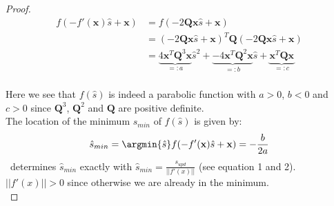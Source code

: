 \begin{proof}
\begin{equation}
\begin{aligned}
f(-f'(\mathbf{x})\hat{s}+\mathbf{x})&=
f(-2\mathbf{Q}\mathbf{x}\hat{s}+\mathbf{x})\\&=(-2\mathbf{Q}\mathbf{x}\hat{s}+\mathbf{x})^T\mathbf{Q}(-2\mathbf{Q}\mathbf{x}\hat{s}+\mathbf{x})
\\&=\underbrace{4\mathbf{x}^T\mathbf{Q}^3\mathbf{x}}_{=:a}\hat{s}^2+\underbrace{-4\mathbf{x}^T\mathbf{Q}^2\mathbf{x}}_{=:b}\hat{s}+\underbrace{\mathbf{x}^T\mathbf{Q}\mathbf{x}}_{=:c}
\end{aligned}
\end{equation}
 \\ Here we see that $f(\hat{s})$ is indeed a parabolic function with $a>0$, $b<0$ and $c>0$ since $\mathbf{Q}^3$, $\mathbf{Q}^2$ and $\mathbf{Q}$ are positive definite.\\
The location of the minimum $s_{min}$ of $f(\hat{s})$ is given by:
\begin{equation}
	 \hat{s}_{min}=\argmin{\hat{s}} f(-f'(\mathbf{x})\hat{s}+\mathbf{x})=-\frac{b}{2a}
\end{equation}
 \pal\ determines $\hat{s}_{min}$ exactly with $\hat{s}_{min}=\frac{s_{upd}}{||f'(x)||}$ (see equation 1 and 2). $||f'(x)||>0$  since otherwise we are already in the minimum.\\


\end{proof}
